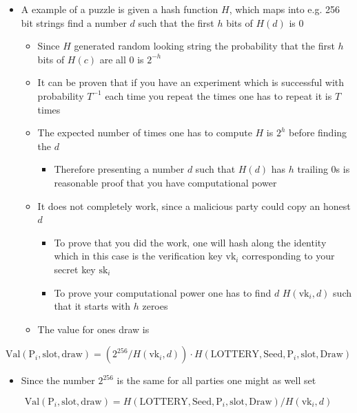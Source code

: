 \documentclass[11pt]{article}
\begin{document}
\begin{itemize}
\item A example of a puzzle is given a hash function \(H\), which maps into e.g. 256 bit strings find a number \(d\) such that the first \(h\) bits of \(H(d)\) is 0
\begin{itemize}
\item Since \(H\) generated random looking string the probability that the first \(h\) bits of \(H(c)\) are all \(0\) is \(2^{-h}\)
\item It can be proven that if you have an experiment which is successful with probability \(T^{-1}\) each time you repeat the times one has to repeat it is \(T\) times
\item The expected number of times one has to compute \(H\) is \(2^h\) before finding the \(d\) 
\begin{itemize}
\item Therefore presenting a number \(d\) such that \(H(d)\) has \(h\) trailing 0s is reasonable proof that you have computational power
\end{itemize}
\item It does not completely work, since a malicious party could copy an honest \(d\)
\begin{itemize}
\item To prove that you did the work, one will hash along the identity which in this case is the verification key \(\text{vk}_i\) corresponding to your secret key \(\text{sk}_i\)
\item To prove your computational power one has to find \(d\) \(H(\text{vk}_i,d)\) such that it starts with \(h\) zeroes
\end{itemize}
\item The value for ones draw is
\end{itemize}
\end{itemize}
\begin{equation}
  \text{Val}(\text{P}_i, \text{slot}, \text{draw}) = (2^{256}/H(\text{vk}_i,d)) \cdot H(\text{LOTTERY},\text{Seed}, \text{P}_i, \text{slot}, \text{Draw})
\end{equation}
\begin{itemize}
\item Since the number \(2^{256}\) is the same for all parties one might as well set
\end{itemize}
\begin{equation}
  \text{Val}(\text{P}_i, \text{slot}, \text{draw}) = H(\text{LOTTERY},\text{Seed}, \text{P}_i, \text{slot}, \text{Draw})/H(\text{vk}_i,d)
\end{equation} 
\end{document}
